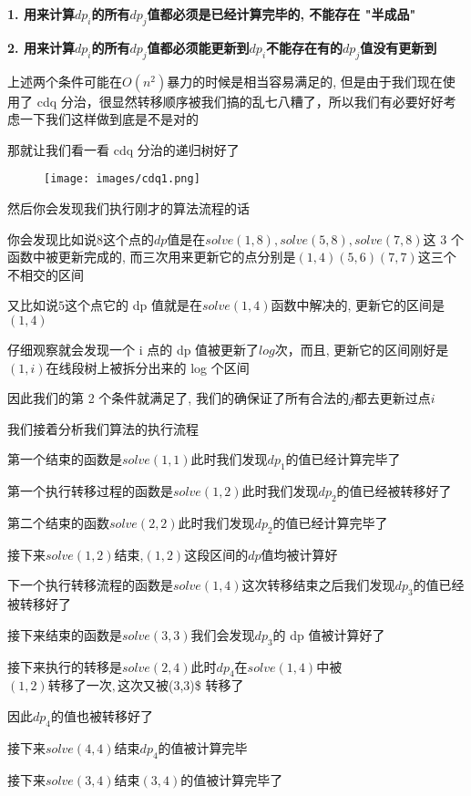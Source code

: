 \textbf{1. 用来计算$dp_{i}$的所有$dp_{j}$值都必须是已经计算完毕的, 不能存在 "半成品"}

\textbf{2. 用来计算$dp_{i}$的所有$dp_{j}$值都必须能更新到$dp_{i}$不能存在有的$dp_{j}$值没有更新到}

上述两个条件可能在$O(n^2)$暴力的时候是相当容易满足的, 但是由于我们现在使用了 cdq 分治，很显然转移顺序被我们搞的乱七八糟了，所以我们有必要好好考虑一下我们这样做到底是不是对的

那就让我们看一看 cdq 分治的递归树好了

\begin{figure}[h]
\centering
\texttt{[image: images/cdq1.png]} 

\end{figure}

然后你会发现我们执行刚才的算法流程的话

你会发现比如说$8$这个点的$dp$值是在$solve(1,8),solve(5,8),solve(7,8)$这 3 个函数中被更新完成的, 而三次用来更新它的点分别是$(1,4)(5,6)(7,7)$这三个不相交的区间

又比如说$5$这个点它的 dp 值就是在$solve(1,4)$函数中解决的, 更新它的区间是$(1,4)$

仔细观察就会发现一个 i 点的 dp 值被更新了$log$次，而且, 更新它的区间刚好是$(1,i)$在线段树上被拆分出来的 log 个区间

因此我们的第 2 个条件就满足了, 我们的确保证了所有合法的$j$都去更新过点$i$

我们接着分析我们算法的执行流程

第一个结束的函数是$solve(1,1)$此时我们发现$dp_{1}$的值已经计算完毕了

第一个执行转移过程的函数是$solve(1,2)$此时我们发现$dp_{2}$的值已经被转移好了

第二个结束的函数$solve(2,2)$此时我们发现$dp_{2}$的值已经计算完毕了

接下来$solve(1,2)$结束,$(1,2)$这段区间的$dp$值均被计算好

下一个执行转移流程的函数是$solve(1,4)$这次转移结束之后我们发现$dp_{3}$的值已经被转移好了

接下来结束的函数是$solve(3,3)$我们会发现$dp_{3}$的 dp 值被计算好了

接下来执行的转移是$solve(2,4)$此时$dp_{4}$在$solve(1,4)$中被$(1,2)转移了一次,这次又被$(3,3)\$ 转移了

因此$dp_{4}$的值也被转移好了

接下来$solve(4,4)$结束$dp_{4}$的值被计算完毕

接下来$solve(3,4)$结束$(3,4)$的值被计算完毕了

